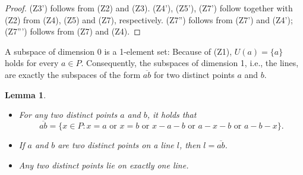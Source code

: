 \documentclass[11pt,a4paper]{article}
\newcommand{\betw}[3]{#1 - #2 - #3}
\newcommand{\lineab}[1]{\overline{#1}}
\newtheorem{lemma}[theorem]{Lemma}
\begin{document}
\begin{proof}
(Z3') follows from (Z2) and (Z3). (Z4'), (Z5'), (Z7') follow together with (Z2) from (Z4), (Z5) and (Z7), respectively. (Z7'') follows from (Z7') and (Z4'); (Z7''') follows from (Z7) and (Z4).
\end{proof}

A subspace of dimension 0 is a 1-element set: Because of (Z1), $U(a) = \{a\}$ holds for every $a \in P$. Consequently, the subspaces of dimension 1, i.e., the lines, are exactly the subspaces of the form $\lineab{ab}$ for two distinct points $a$ and $b$.

\begin{lemma} \label{lem:line_properties}
\begin{itemize}
    \item[(i)] For any two distinct points $a$ and $b$, it holds that
    \begin{equation} \label{eq:line_def}
    \lineab{ab} = \{x \in P : x = a \text{ or } x = b \text{ or } \betw{x}{a}{b} \text{ or } \betw{a}{x}{b} \text{ or } \betw{a}{b}{x}\}.
    \end{equation}
    \item[(ii)] If $a$ and $b$ are two distinct points on a line $l$, then $l = \lineab{ab}$.
    \item[(iii)] Any two distinct points lie on exactly one line.
\end{itemize}
\end{lemma}
\end{document}
